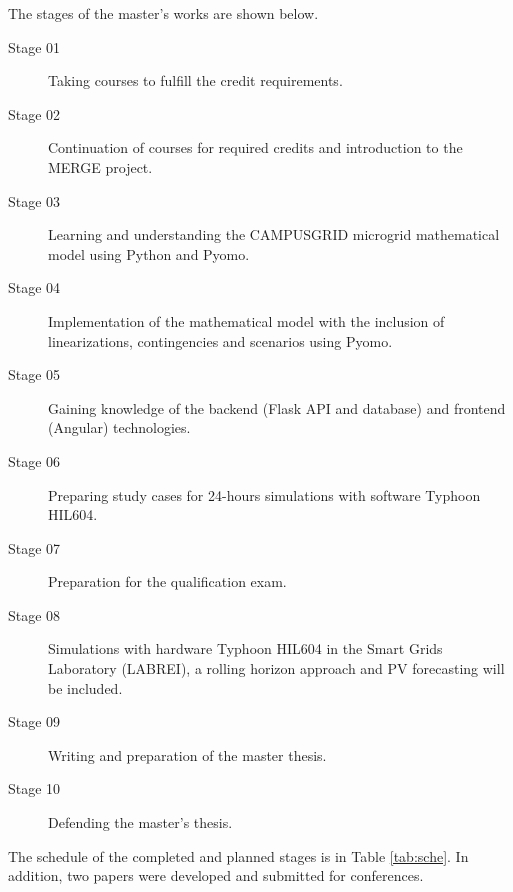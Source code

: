 \documentclass[preprint, 10pt, 5p]{elsarticle}
\begin{document}
The stages of the master's works are shown below.

\begin{description}
    \item[Stage 01] Taking courses to fulfill the credit requirements.
    \item[Stage 02] Continuation of courses for required credits and 
                    introduction to the MERGE project.
    \item[Stage 03] Learning and understanding the CAMPUSGRID microgrid 
                    mathematical model using Python and Pyomo.
    \item[Stage 04] Implementation of the mathematical model with the inclusion 
                    of linearizations, contingencies and scenarios using Pyomo.
    \item[Stage 05] Gaining knowledge of the backend (Flask API and database) 
                    and frontend (Angular) technologies.
    \item[Stage 06] Preparing study cases for 24-hours simulations with software
                    Typhoon HIL604. 
    \item[Stage 07] Preparation for the qualification exam. 
    \item[Stage 08] Simulations with hardware Typhoon HIL604 in the 
                    Smart Grids Laboratory (LABREI), a rolling horizon approach
                    and PV forecasting will be included. 
    \item[Stage 09] Writing and preparation of the master thesis.
    \item[Stage 10] Defending the master's thesis.
\end{description}\par
\vspace{3 pt}

The schedule of the completed and planned stages is in Table \ref{tab:sche}. 
In addition, two papers were developed and submitted for conferences.
\end{document}
